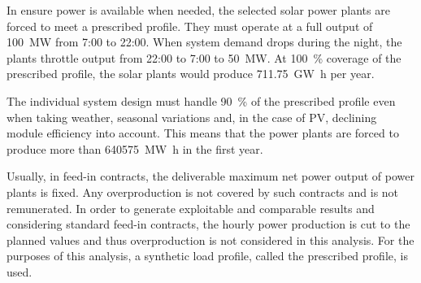 In ensure power is available when needed, the selected solar power plants are forced to meet a prescribed profile. They must operate at a full output of \SI{100}{\mega\watt} from 7:00 to 22:00. When system demand drops during the night, the plants throttle output from 22:00 to 7:00 to \SI{50}{\mega\watt}. At \SI{100}{\percent} coverage of the prescribed profile, the solar plants would produce \SI{711.75}{\giga\watt\hour} per year.


The individual system design must handle \SI{90}{\percent} of the prescribed profile even when taking weather, seasonal variations and, in the case of PV, declining module efficiency into account. This means that the power plants are forced to produce more than \SI{640575}{\mega\watt\hour} in the first year.

Usually, in feed-in contracts, the deliverable maximum net power output of power plants is fixed. Any overproduction is not covered by such contracts and is not remunerated. In order to generate exploitable and comparable results and considering standard feed-in contracts, the hourly power production is cut to the planned values and thus overproduction is not considered in this analysis. For the purposes of this analysis, a synthetic load profile, called the prescribed profile, is used.



